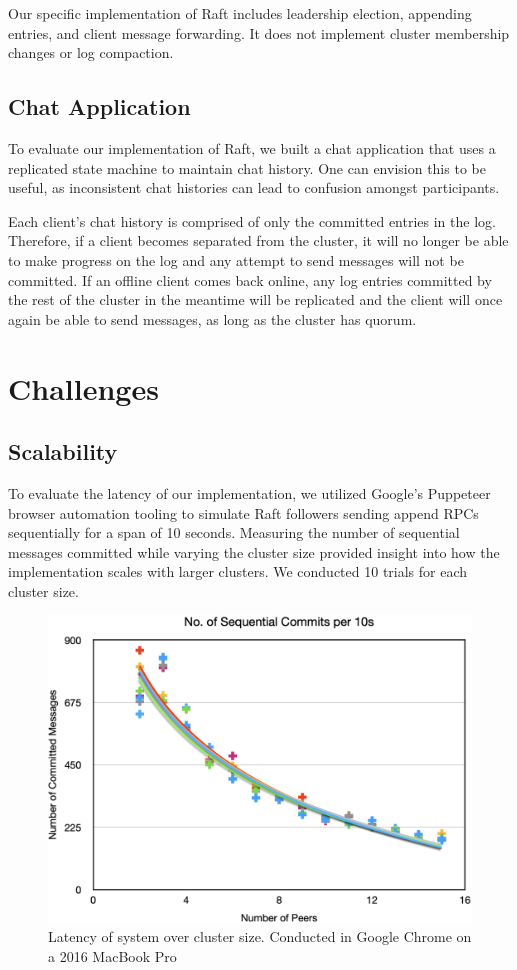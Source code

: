 \documentclass[11pt,twocolumn]{article}
\begin{document}
Our specific implementation of Raft includes leadership election, appending entries, and client message forwarding. It does not implement cluster membership changes or log compaction.

\subsection{Chat Application}
To evaluate our implementation of Raft, we built a chat application that uses a replicated state machine to maintain chat history. One can envision this to be useful, as inconsistent chat histories can lead to confusion amongst participants.

Each client's chat history is comprised of only the committed entries in the log. Therefore, if a client becomes separated from the cluster, it will no longer be able to make progress on the log and any attempt to send messages will not be committed. If an offline client comes back online, any log entries committed by the rest of the cluster in the meantime will be replicated and the client will once again be able to send messages, as long as the cluster has quorum.

\section{Challenges}

\subsection{Scalability}
To evaluate the latency of our implementation, we utilized Google's Puppeteer browser automation tooling to simulate Raft followers sending append RPCs sequentially for a span of 10 seconds. Measuring the number of sequential messages committed while varying the cluster size provided insight into how the implementation scales with larger clusters. We conducted 10 trials for each cluster size.\\

\begin{figure}[t]
\centering
\includegraphics[scale=0.4]{performance}
\caption{Latency of system over cluster size. Conducted in Google Chrome on a 2016 MacBook Pro}
\end{figure}
\end{document}
